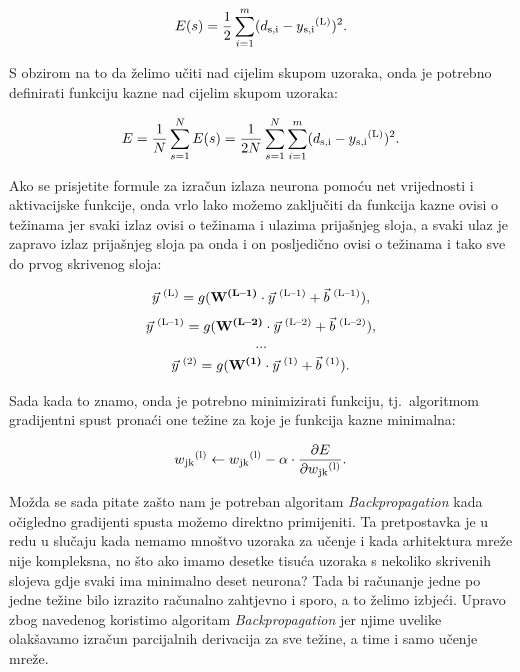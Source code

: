 \documentclass[times, utf8, zavrsni]{fer}
\begin{document}
\begin{equation}
    \label{eq:sample-err}
    E(s) = \frac{1}{2}\sum\limits_{i=1}^m(d\textsubscript{s,i} - y\textsubscript{s,i}\textsuperscript{(L)})^2.
\end{equation}

S obzirom na to da želimo učiti nad cijelim skupom uzoraka, onda je potrebno definirati funkciju kazne nad cijelim skupom uzoraka:

\begin{equation}
    \label{eq:err}
    E = \frac{1}{N}\sum\limits_{s=1}^NE(s) = \frac{1}{2N}\sum\limits_{s=1}^N\sum\limits_{i=1}^m(d\textsubscript{s,i} - y\textsubscript{s,i}\textsuperscript{(L)})^2.
\end{equation}

Ako se prisjetite formule za izračun izlaza neurona pomoću net vrijednosti i aktivacijske funkcije, onda vrlo lako možemo zaključiti da funkcija kazne ovisi o težinama jer svaki izlaz ovisi o težinama i ulazima prijašnjeg sloja, a svaki ulaz je zapravo izlaz prijašnjeg sloja pa onda i on posljedično ovisi o težinama i tako sve do prvog skrivenog sloja:

\[
    \vec{y}\textsuperscript{ (L)} = g(\textbf{W\textsuperscript{(L--1)}} \cdot{\vec{y}\textsuperscript{ (L--1)}} + \vec{b}\textsuperscript{ (L--1)}),
\]
\[
    \vec{y}\textsuperscript{ (L--1)} = g(\textbf{W\textsuperscript{(L--2)}} \cdot{\vec{y}\textsuperscript{ (L--2)}} + \vec{b}\textsuperscript{ (L--2)}),
\]
\[
    \dots
\]
\[
    \vec{y}\textsuperscript{ (2)} = g(\textbf{W\textsuperscript{(1)}} \cdot{\vec{y}\textsuperscript{ (1)}} + \vec{b}\textsuperscript{ (1)}).
\]

Sada kada to znamo, onda je potrebno minimizirati funkciju, tj.\ algoritmom gradijentni spust pronaći one težine za koje je funkcija kazne minimalna:

\begin{equation}
    \label{eq:weight-grad}
    w\textsubscript{jk}\textsuperscript{(l)} \leftarrow  w\textsubscript{jk}\textsuperscript{(l)} - \alpha \cdot{\frac{\partial E}{\partial w\textsubscript{jk}\textsuperscript{(l)}}}.
\end{equation}

Možda se sada pitate zašto nam je potreban algoritam \textit{Backpropagation} kada očigledno gradijenti spusta možemo direktno primijeniti. Ta pretpostavka je u redu u slučaju kada nemamo mnoštvo uzoraka za učenje i kada arhitektura mreže nije kompleksna, no što ako imamo desetke tisuća uzoraka s nekoliko skrivenih slojeva gdje svaki ima minimalno deset neurona? Tada bi računanje jedne po jedne težine bilo izrazito računalno zahtjevno i sporo, a to želimo izbjeći. Upravo zbog navedenog koristimo algoritam \textit{Backpropagation} jer njime uvelike olakšavamo izračun parcijalnih derivacija za sve težine, a time i samo učenje mreže.
\end{document}
